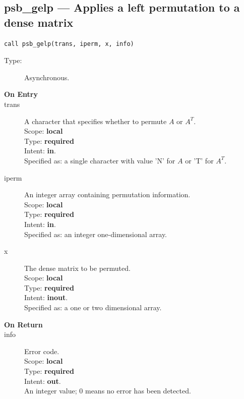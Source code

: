 %
%
\clearpage\subsection{psb\_gelp --- Applies a left permutation to a dense
  matrix}

\begin{verbatim}
call psb_gelp(trans, iperm, x, info)
\end{verbatim}

\begin{description}
\item[Type:] Asynchronous.
\item[\bf On Entry]
\item[trans] A character that specifies whether to permute $A$  or $A^T$.\\
Scope: {\bf local} \\
Type: {\bf required}\\
Intent: {\bf in}.\\
Specified as: a single character with value 'N' for $A$ or 'T' for $A^T$.\\
\item[iperm] An integer array containing permutation information.\\
Scope: {\bf local} \\
Type: {\bf required}\\
Intent: {\bf in}.\\
Specified as: an integer one-dimensional array.\\
\item[x] The dense matrix to be permuted.\\
Scope: {\bf local} \\
Type: {\bf required}\\
Intent: {\bf inout}.\\
Specified as: a one or two dimensional array.\\
\end{description}

\begin{description}
\item[\bf On Return]
\item[info] Error code.\\
Scope: {\bf local} \\
Type: {\bf required} \\
Intent: {\bf out}.\\
An integer value; 0 means no error has been detected. 
\end{description}


